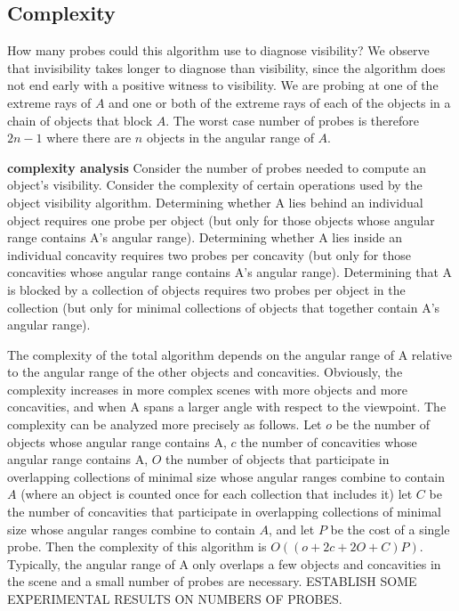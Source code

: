 \documentclass[12pt]{article}
\begin{document}
\subsection{Complexity}

How many probes could this algorithm use to diagnose visibility?
We observe that invisibility takes longer to diagnose than visibility, 
since the algorithm does not end early with a positive witness to visibility.
We are probing at one of the extreme rays of $A$ and 
one or both of the extreme rays of each of the objects in a chain of objects 
that block $A$.
The worst case number of probes is therefore $2n-1$ where there are $n$ objects
in the angular range of $A$.

{\bf complexity analysis}
Consider the number of probes needed to compute an object's visibility.
Consider the complexity of certain operations used by the object visibility algorithm.
Determining whether A lies behind an individual object 
requires one probe per object (but only for those objects whose angular range
contains A's angular range).
Determining whether A lies inside an individual concavity
requires two probes per concavity (but only for those concavities whose angular range
contains A's angular range).
Determining that A is blocked by a collection of objects 
requires two probes per object in the collection 
(but only for minimal collections of objects that together contain A's angular range).

The complexity of the total algorithm depends on the angular range of A relative
to the angular range of the other objects and concavities.
Obviously, the complexity increases in more complex scenes with more objects and more 
concavities, and when A spans a larger angle with respect to the viewpoint.
The complexity can be analyzed more precisely as follows.
Let $o$ be the number of objects whose angular range contains A,
$c$ the number of concavities whose angular range contains A,
$O$ the number of objects that participate in overlapping collections of minimal size
whose angular ranges combine to contain $A$ (where an object is counted once for each
collection that includes it)
let $C$ be the number of concavities that participate in overlapping collections
of minimal size whose angular ranges combine to contain $A$,
and let $P$ be the cost of a single probe.
Then the complexity of this algorithm is $O((o+2c+2O+C)P)$.
Typically, the angular range of A only overlaps a few objects and concavities
in the scene and a small number of probes are necessary.
ESTABLISH SOME EXPERIMENTAL RESULTS ON NUMBERS OF PROBES.
\end{document}
